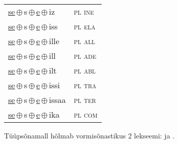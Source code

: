 \begin{minipage}{\textwidth}
\begin{sideways}
\begin{tabular}{l l}
\underline{se}\,$\oplus$\,s\,$\oplus$\,\underline{e}\,$\oplus$\,iz & \textsc{ pl ine } \\
\underline{se}\,$\oplus$\,s\,$\oplus$\,\underline{e}\,$\oplus$\,iss & \textsc{ pl ela } \\
\underline{se}\,$\oplus$\,s\,$\oplus$\,\underline{e}\,$\oplus$\,ille & \textsc{ pl all } \\
\underline{se}\,$\oplus$\,s\,$\oplus$\,\underline{e}\,$\oplus$\,ill & \textsc{ pl ade } \\
\underline{se}\,$\oplus$\,s\,$\oplus$\,\underline{e}\,$\oplus$\,ilt & \textsc{ pl abl } \\
\underline{se}\,$\oplus$\,s\,$\oplus$\,\underline{e}\,$\oplus$\,issi & \textsc{ pl tra } \\
\underline{se}\,$\oplus$\,s\,$\oplus$\,\underline{e}\,$\oplus$\,issaa & \textsc{ pl ter } \\
\underline{se}\,$\oplus$\,s\,$\oplus$\,\underline{e}\,$\oplus$\,ika & \textsc{ pl com } \\
\end{tabular}
\end{sideways}
\label{tab:tüüpsõnamall-sese}

\end{minipage}

 
\vspace{1em}
\noindent Tüüpsõnamall  hõlmab vormisõnastikus 2 lekseemi:  ja .
